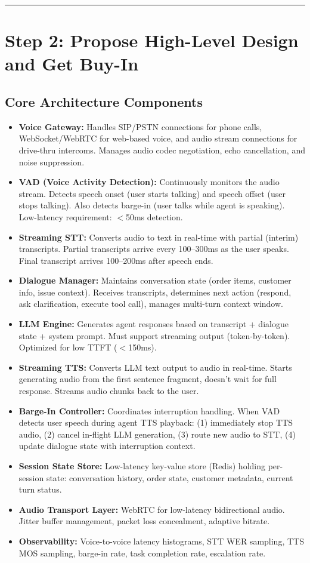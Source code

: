 \bigskip\hrule\bigskip

\section*{Step 2: Propose High-Level Design and Get Buy-In}

\subsection*{Core Architecture Components}
\begin{itemize}
  \item \textbf{Voice Gateway:} Handles SIP/PSTN connections for phone calls, WebSocket/WebRTC for web-based voice, and audio stream connections for drive-thru intercoms. Manages audio codec negotiation, echo cancellation, and noise suppression.
  \item \textbf{VAD (Voice Activity Detection):} Continuously monitors the audio stream. Detects speech onset (user starts talking) and speech offset (user stops talking). Also detects barge-in (user talks while agent is speaking). Low-latency requirement: $<$50ms detection.
  \item \textbf{Streaming STT:} Converts audio to text in real-time with partial (interim) transcripts. Partial transcripts arrive every 100--300ms as the user speaks. Final transcript arrives 100--200ms after speech ends.
  \item \textbf{Dialogue Manager:} Maintains conversation state (order items, customer info, issue context). Receives transcripts, determines next action (respond, ask clarification, execute tool call), manages multi-turn context window.
  \item \textbf{LLM Engine:} Generates agent responses based on transcript + dialogue state + system prompt. Must support streaming output (token-by-token). Optimized for low TTFT ($<$150ms).
  \item \textbf{Streaming TTS:} Converts LLM text output to audio in real-time. Starts generating audio from the first sentence fragment, doesn't wait for full response. Streams audio chunks back to the user.
  \item \textbf{Barge-In Controller:} Coordinates interruption handling. When VAD detects user speech during agent TTS playback: (1) immediately stop TTS audio, (2) cancel in-flight LLM generation, (3) route new audio to STT, (4) update dialogue state with interruption context.
  \item \textbf{Session State Store:} Low-latency key-value store (Redis) holding per-session state: conversation history, order state, customer metadata, current turn status.
  \item \textbf{Audio Transport Layer:} WebRTC for low-latency bidirectional audio. Jitter buffer management, packet loss concealment, adaptive bitrate.
  \item \textbf{Observability:} Voice-to-voice latency histograms, STT WER sampling, TTS MOS sampling, barge-in rate, task completion rate, escalation rate.
\end{itemize}

